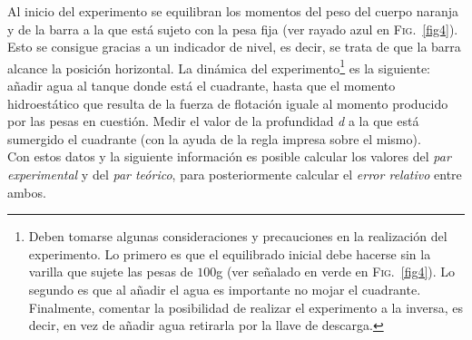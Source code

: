 \documentclass[12pt,a4paper]{article}
\begin{document}
Al inicio del experimento se equilibran los momentos del peso del cuerpo naranja y de la barra a la que está sujeto con la pesa fija (ver rayado azul en \textsc{Fig.}~\ref{fig4}). Esto se consigue gracias a un indicador de nivel, es decir, se trata de que la barra alcance la posición horizontal. La dinámica del experimento\footnote{Deben tomarse algunas consideraciones y precauciones en la realización del experimento. Lo primero es que el equilibrado inicial debe hacerse sin la varilla que sujete las pesas de $100$g (ver señalado en verde en \textsc{Fig.}~\ref{fig4}). Lo segundo es que al añadir el agua es importante no mojar el cuadrante. Finalmente, comentar la posibilidad de realizar el experimento a la inversa, es decir, en vez de añadir agua retirarla por la llave de descarga.} es la siguiente:   añadir agua al tanque donde está el cuadrante, hasta que el momento hidroestático que resulta de la fuerza de flotación iguale al momento producido por las pesas en cuestión. Medir el valor de la profundidad \emph{d} a la que está sumergido el cuadrante (con la ayuda de la regla impresa sobre el mismo).\\

Con estos datos y la siguiente información es posible calcular los valores del \emph{par experimental} y del \emph{par teórico}, para posteriormente calcular el \emph{error relativo} entre ambos.
\end{document}
